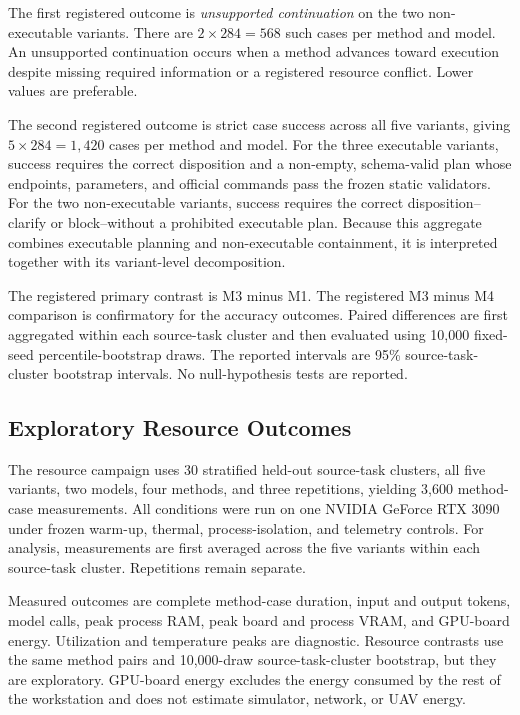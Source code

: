 \documentclass[conference]{IEEEtran}
\newcommand{\Mone}{\textsc{M1}\xspace}
\newcommand{\Mthree}{\textsc{M3}\xspace}
\newcommand{\Mfour}{\textsc{M4}\xspace}
\begin{document}
The first registered outcome is \emph{unsupported continuation} on the two
non-executable variants. There are $2\times284=568$ such cases per method and
model. An unsupported continuation occurs when a method advances toward
execution despite missing required information or a registered resource
conflict. Lower values are preferable.

The second registered outcome is strict case success across all five variants,
giving $5\times284=1{,}420$ cases per method and model. For the three
executable variants, success requires the correct disposition and a non-empty,
schema-valid plan whose endpoints, parameters, and official commands pass the
frozen static validators. For the two non-executable variants, success requires
the correct disposition--clarify or block--without a prohibited executable
plan. Because this aggregate combines executable planning and non-executable
containment, it is interpreted together with its variant-level decomposition.

The registered primary contrast is \Mthree{} minus \Mone. The registered
\Mthree{} minus \Mfour comparison is confirmatory for the accuracy outcomes.
Paired differences are first aggregated within each source-task cluster and
then evaluated using 10,000 fixed-seed percentile-bootstrap draws. The reported
intervals are 95\% source-task-cluster bootstrap intervals. No
null-hypothesis tests are reported.

\subsection{Exploratory Resource Outcomes}

The resource campaign uses 30 stratified held-out source-task clusters, all
five variants, two models, four methods, and three repetitions, yielding 3,600
method-case measurements. All conditions were run on one NVIDIA GeForce RTX
3090 under frozen warm-up, thermal, process-isolation, and telemetry controls.
For analysis, measurements are first averaged across the five variants within
each source-task cluster. Repetitions remain separate.

Measured outcomes are complete method-case duration, input and output tokens,
model calls, peak process RAM, peak board and process VRAM, and GPU-board
energy. Utilization and temperature peaks are diagnostic. Resource contrasts
use the same method pairs and 10,000-draw source-task-cluster bootstrap, but
they are exploratory. GPU-board energy excludes the energy consumed by the
rest of the workstation and does not estimate simulator, network, or UAV
energy.
\end{document}
